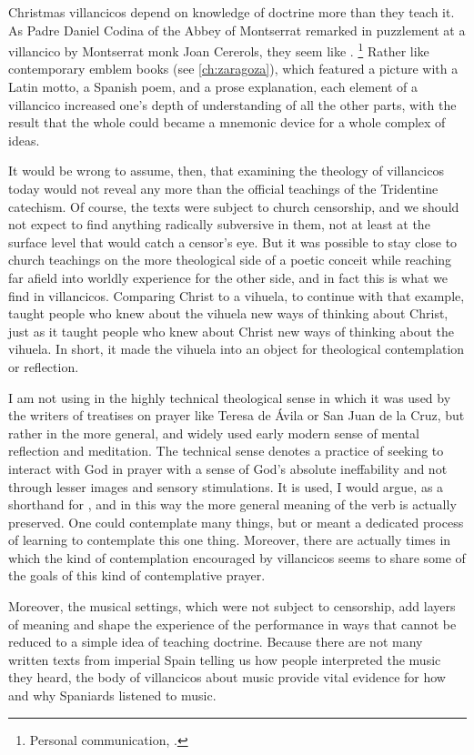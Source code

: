 Christmas villancicos depend on knowledge of doctrine more than they teach it.
As Padre Daniel Codina of the Abbey of Montserrat remarked in puzzlement at a
villancico by Montserrat monk Joan Cererols, they seem like .%
    \footnote{Personal communication, \XXX[date].}
Rather like contemporary emblem books (see \cref{ch:zaragoza}), which featured
a picture with a Latin motto, a Spanish poem, and a prose explanation, each
element of a villancico increased one's depth of understanding of all the other
parts, with the result that the whole could became a mnemonic device for a
whole complex of ideas.

It would be wrong to assume, then, that examining the theology of villancicos
today would not reveal any more than the official teachings of the Tridentine
catechism.
Of course, the texts were subject to church censorship, and we should not
expect to find anything radically subversive in them, not at least at the
surface level that would catch a censor's eye.
But it was possible to stay close to church teachings on the more theological
side of a poetic conceit while reaching far afield into worldly experience for
the other side, and in fact this is what we find in villancicos.
Comparing Christ to a vihuela, to continue with that example, taught people who
knew about the vihuela new ways of thinking about Christ, just as it taught
people who knew about Christ new ways of thinking about the vihuela.
In short, it made the vihuela into an object for theological contemplation or
reflection.%
\begin{Footnote}
    I am not using  in the highly technical theological
    sense in which it was used by the writers of treatises on prayer like
    Teresa de Ávila or San Juan de la Cruz, but rather in the more general, and
    widely used early modern sense of mental reflection and meditation.
    The technical sense denotes a practice of seeking to interact with God in
    prayer with a sense of God's absolute ineffability and not through lesser
    images and sensory stimulations. 
    It is used, I would argue, as a shorthand for , and in this way the more general meaning of the verb is
    actually preserved.
    One could contemplate many things, but  or
     meant a dedicated process of learning to
    contemplate this one thing.
    Moreover, there are actually times in which the kind of contemplation
    encouraged by villancicos seems to share some of the goals of this kind of
    contemplative prayer.
\end{Footnote}
Moreover, the musical settings, which were not subject to censorship, add
layers of meaning and shape the experience of the performance in ways that
cannot be reduced to a simple idea of teaching doctrine.
Because there are not many written texts from imperial Spain telling us how
people interpreted the music they heard, the body of villancicos about music
provide vital evidence for how and why Spaniards listened to music.

